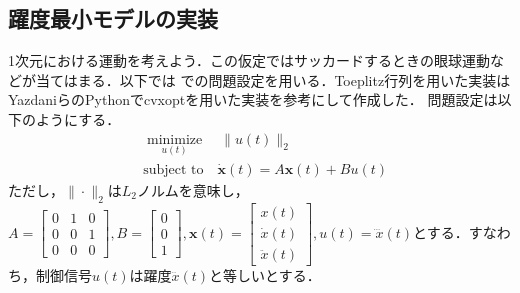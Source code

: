 \subsection{躍度最小モデルの実装}1次元における運動を考えよう．この仮定ではサッカードするときの眼球運動などが当てはまる．以下では \cite{Yazdani2012-sx} での問題設定を用いる．Toeplitz行列を用いた実装はYazdaniらのPythonでcvxoptを用いた実装を参考にして作成した．
問題設定は以下のようにする．
$$
\begin{align}
&\underset{u(t)}{\operatorname{minimize}}\quad \|u(t)\|_2 \\
&\text{subject to} \quad \dot{\mathbf{x}}(t)=A \mathbf{x}(t)+B u(t)
\end{align}
$$
ただし，$\|\cdot\|_{2}$は$L_{2}$ノルムを意味し，$A=\left[\begin{array}{lll}0 & 1 & 0 \\ 0 & 0 & 1 \\ 0 & 0 & 0\end{array}\right], B=\left[\begin{array}{l}0 \\ 0 \\ 1\end{array}\right], \mathbf{x}(t)=\left[\begin{array}{l}x(t) \\ \dot{x}(t) \\ \ddot{x}(t)\end{array}\right], u(t)=\dddot x(t)$とする．すなわち，制御信号$u(t)$は躍度$\dddot x(t)$と等しいとする．